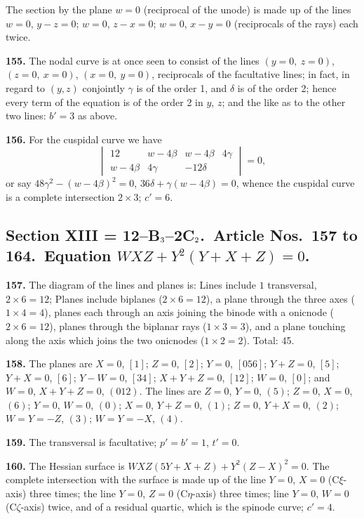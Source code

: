 \documentclass[11pt,a4paper]{article}
\theoremstyle{definition}
\begin{document}
The section by the plane $w=0$ (reciprocal of the unode) is made up of the lines $w=0$, $y-z=0$; $w=0$, $z-x=0$; $w=0$, $x-y=0$ (reciprocals of the rays) each twice.

\noindent\textbf{155.} The nodal curve is at once seen to consist of the lines $(y=0,\ z=0)$, $(z=0,\ x=0)$, $(x=0,\ y=0)$, reciprocals of the facultative lines; in fact, in regard to $(y,z)$ conjointly $\gamma$ is of the order 1, and $\delta$ is of the order 2; hence every term of the equation is of the order 2 in $y$, $z$; and the like as to the other two lines: $b'=3$ as above.

\setcounter{page}{433}

\noindent\textbf{156.} For the cuspidal curve we have
\[
\begin{vmatrix}
12 & w-4\beta & w-4\beta & 4\gamma \\
w-4\beta & 4\gamma & -12\delta
\end{vmatrix}=0,
\]
or say $48\gamma^2-(w-4\beta)^2=0$, $36\delta+\gamma(w-4\beta)=0$, whence the cuspidal curve is a complete intersection $2\times 3$; $c'=6$.

\subsection*{Section XIII = 12--B$_{\mbox{\scriptsize 3}}$--2C$_{\mbox{\scriptsize 2}}$.\ Article Nos.\ 157 to 164.\ Equation $WXZ+Y^2(Y+X+Z)=0$.}

\noindent\textbf{157.} The diagram of the lines and planes is: Lines include $1$ transversal, $2\times 6=12$; Planes include biplanes ($2\times 6=12$), a plane through the three axes ($1\times 4=4$), planes each through an axis joining the binode with a onicnode ($2\times 6=12$), planes through the biplanar rays ($1\times 3=3$), and a plane touching along the axis which joins the two onicnodes ($1\times 2=2$). Total: 45.

\noindent\textbf{158.} The planes are $X=0$, $[1]$; $Z=0$, $[2]$; $Y=0$, $[056]$; $Y+Z=0$, $[5]$; $Y+X=0$, $[6]$; $Y-W=0$, $[34]$; $X+Y+Z=0$, $[12]$; $W=0$, $[0]$; and $W=0$, $X+Y+Z=0$, $(012)$. The lines are $Z=0$, $Y=0$, $(5)$; $Z=0$, $X=0$, $(6)$; $Y=0$, $W=0$, $(0)$; $X=0$, $Y+Z=0$, $(1)$; $Z=0$, $Y+X=0$, $(2)$; $W=Y=-Z$, $(3)$; $W=Y=-X$, $(4)$.

\noindent\textbf{159.} The transversal is facultative; $p'=b'=1$, $t'=0$.

\noindent\textbf{160.} The Hessian surface is $WXZ(5Y+X+Z)+Y^2(Z-X)^2=0$. The complete intersection with the surface is made up of the line $Y=0$, $X=0$ (C$\xi$-axis) three times; the line $Y=0$, $Z=0$ (C$\eta$-axis) three times; line $Y=0$, $W=0$ (C$\zeta$-axis) twice, and of a residual quartic, which is the spinode curve; $c'=4$.
\end{document}
